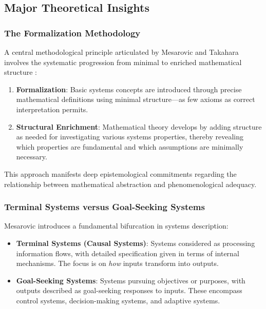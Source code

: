 \subsection{Major Theoretical Insights}

\subsubsection{The Formalization Methodology}

A central methodological principle articulated by Mesarovic and Takahara involves the systematic progression from minimal to enriched mathematical structure \citep{Mesarovic1975}:

\begin{enumerate}
\item \textbf{Formalization}: Basic systems concepts are introduced through precise mathematical definitions using minimal structure---as few axioms as correct interpretation permits.
\item \textbf{Structural Enrichment}: Mathematical theory develops by adding structure as needed for investigating various systems properties, thereby revealing which properties are fundamental and which assumptions are minimally necessary.
\end{enumerate}

This approach manifests deep epistemological commitments regarding the relationship between mathematical abstraction and phenomenological adequacy.

\subsubsection{Terminal Systems versus Goal-Seeking Systems}

Mesarovic \citep{Mesarovic1972} introduces a fundamental bifurcation in systems description:

\begin{itemize}
\item \textbf{Terminal Systems (Causal Systems)}: Systems considered as processing information flows, with detailed specification given in terms of internal mechanisms. The focus is on \emph{how} inputs transform into outputs.

\item \textbf{Goal-Seeking Systems}: Systems pursuing objectives or purposes, with outputs described as goal-seeking responses to inputs. These encompass control systems, decision-making systems, and adaptive systems.
\end{itemize}

